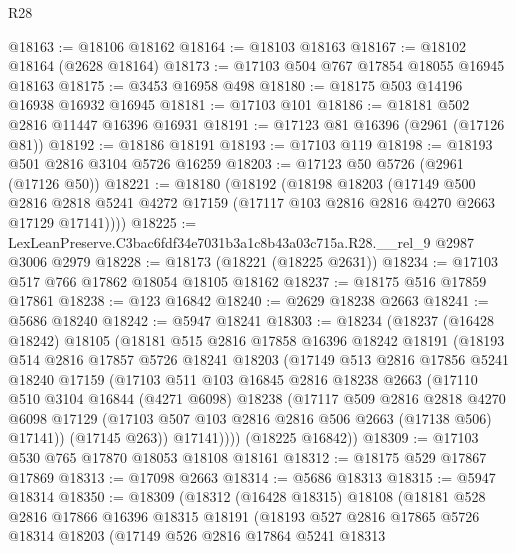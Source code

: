 \begin{lexlean}{R28}
\begin{coremodule}
@18163 := @18106 @18162
@18164 := @18103 @18163
@18167 := @18102 @18164 (@2628 @18164)
@18173 := @17103 @504 @767 @17854 @18055 @16945 @18163
@18175 := @3453 @16958 @498
@18180 := @18175 @503 @14196 @16938 @16932 @16945
@18181 := @17103 @101
@18186 := @18181 @502 @2816 @11447 @16396 @16931
@18191 := @17123 @81 @16396 (@2961 (@17126 @81))
@18192 := @18186 @18191
@18193 := @17103 @119
@18198 := @18193 @501 @2816 @3104 @5726 @16259
@18203 := @17123 @50 @5726 (@2961 (@17126 @50))
@18221 := @18180
    (@18192
      (@18198
        @18203
        (@17149
          @500
          @2816
          @2818
          @5241
          @4272
          @17159
          (@17117 @103 @2816 @2816 @4270 @2663 @17129 @17141))))
@18225 := LexLeanPreserve.C3bac6fdf34e7031b3a1c8b43a03c715a.R28.__rel_9 @2987 @3006 @2979
@18228 := @18173 (@18221 (@18225 @2631))
@18234 := @17103 @517 @766 @17862 @18054 @18105 @18162
@18237 := @18175 @516 @17859 @17861
@18238 := @123 @16842
@18240 := @2629 @18238 @2663
@18241 := @5686 @18240
@18242 := @5947 @18241
@18303 := @18234
    (@18237
      (@16428 @18242)
      @18105
      (@18181
        @515
        @2816
        @17858
        @16396
        @18242
        @18191
        (@18193
          @514
          @2816
          @17857
          @5726
          @18241
          @18203
          (@17149
            @513
            @2816
            @17856
            @5241
            @18240
            @17159
            (@17103
              @511
              @103
              @16845
              @2816
              @18238
              @2663
              (@17110
                @510
                @3104
                @16844
                (@4271 @6098)
                @18238
                (@17117
                  @509
                  @2816
                  @2818
                  @4270
                  @6098
                  @17129
                  (@17103 @507 @103 @2816 @2816 @506 @2663 (@17138 @506) @17141))
                (@17145 @263))
              @17141))))
      (@18225 @16842))
@18309 := @17103 @530 @765 @17870 @18053 @18108 @18161
@18312 := @18175 @529 @17867 @17869
@18313 := @17098 @2663
@18314 := @5686 @18313
@18315 := @5947 @18314
@18350 := @18309
    (@18312
      (@16428 @18315)
      @18108
      (@18181
        @528
        @2816
        @17866
        @16396
        @18315
        @18191
        (@18193
          @527
          @2816
          @17865
          @5726
          @18314
          @18203
          (@17149
            @526
            @2816
            @17864
            @5241
            @18313

\end{coremodule}
\end{lexlean}
